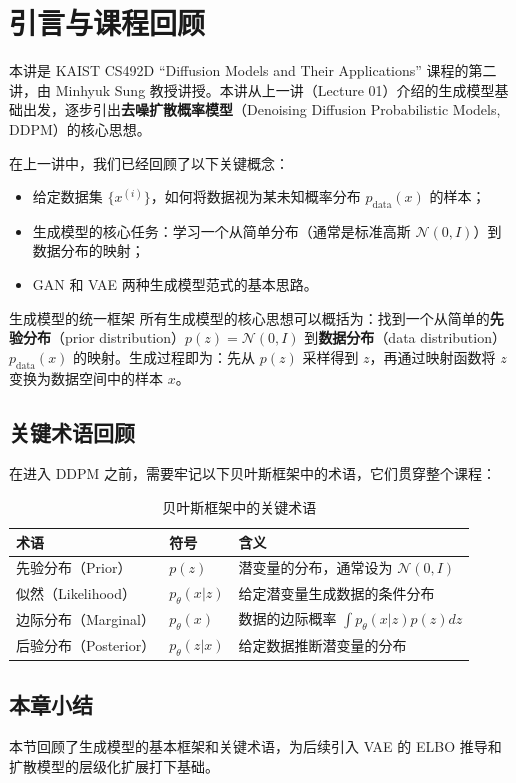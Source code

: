 \section{引言与课程回顾}

本讲是 KAIST CS492D ``Diffusion Models and Their Applications'' 课程的第二讲，由 Minhyuk Sung 教授讲授。本讲从上一讲（Lecture 01）介绍的生成模型基础出发，逐步引出\textbf{去噪扩散概率模型}（Denoising Diffusion Probabilistic Models, DDPM）的核心思想。

在上一讲中，我们已经回顾了以下关键概念：
\begin{itemize}
    \item 给定数据集 $\{x^{(i)}\}$，如何将数据视为某未知概率分布 $p_{\text{data}}(x)$ 的样本；
    \item 生成模型的核心任务：学习一个从简单分布（通常是标准高斯 $\mathcal{N}(0, I)$）到数据分布的映射；
    \item GAN 和 VAE 两种生成模型范式的基本思路。
\end{itemize}

\begin{knowledgebox}{生成模型的统一框架}
所有生成模型的核心思想可以概括为：找到一个从简单的\textbf{先验分布}（prior distribution）$p(z) = \mathcal{N}(0, I)$ 到\textbf{数据分布}（data distribution）$p_{\text{data}}(x)$ 的映射。生成过程即为：先从 $p(z)$ 采样得到 $z$，再通过映射函数将 $z$ 变换为数据空间中的样本 $x$。
\end{knowledgebox}

\subsection{关键术语回顾}

在进入 DDPM 之前，需要牢记以下贝叶斯框架中的术语，它们贯穿整个课程：

\begin{table}[H]
\centering
\begin{tabular}{lll}
\toprule
\textbf{术语} & \textbf{符号} & \textbf{含义} \\
\midrule
先验分布（Prior） & $p(z)$ & 潜变量的分布，通常设为 $\mathcal{N}(0, I)$ \\
似然（Likelihood） & $p_\theta(x|z)$ & 给定潜变量生成数据的条件分布 \\
边际分布（Marginal） & $p_\theta(x)$ & 数据的边际概率 $\int p_\theta(x|z)p(z)dz$ \\
后验分布（Posterior） & $p_\theta(z|x)$ & 给定数据推断潜变量的分布 \\
\bottomrule
\end{tabular}
\caption{贝叶斯框架中的关键术语}
\end{table}

\subsection{本章小结}

本节回顾了生成模型的基本框架和关键术语，为后续引入 VAE 的 ELBO 推导和扩散模型的层级化扩展打下基础。


